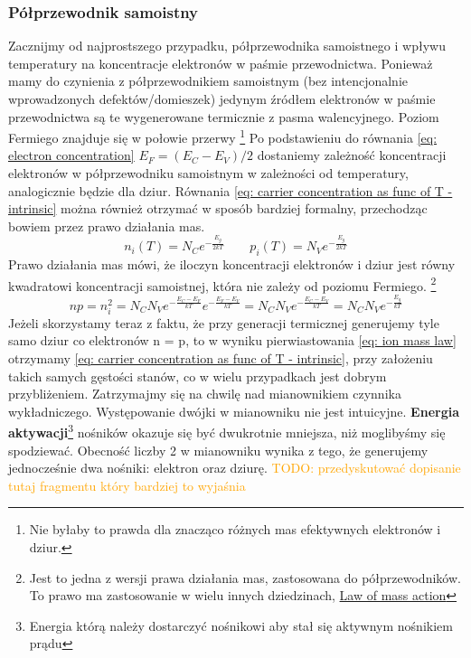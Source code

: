         \subsubsection{Półprzewodnik samoistny}
            Zacznijmy od najprostszego przypadku, półprzewodnika samoistnego i wpływu temperatury na koncentracje elektronów w paśmie przewodnictwa. 
            Ponieważ mamy do czynienia z półprzewodnikiem samoistnym (bez intencjonalnie wprowadzonych defektów/domieszek) jedynym źródłem elektronów w paśmie przewodnictwa są  te
            wygenerowane termicznie z pasma walencyjnego. Poziom Fermiego znajduje się w połowie przerwy \footnote{Nie byłaby to prawda dla znacząco różnych mas efektywnych elektronów i dziur.} 
            Po podstawieniu do równania \ref{eq: electron concentration} $E_F = (E_C - E_V)/2$ dostaniemy zależność koncentracji elektronów w półprzewodniku samoistnym w zależności od temperatury, analogicznie będzie dla dziur. 
            Równania \ref{eq: carrier concentration as func of T - intrinsic} można również otrzymać w sposób bardziej formalny, przechodząc bowiem przez prawo działania mas. \\
            \begin{equation}
                n_i(T) = N_Ce^{-\frac{E_g}{2kT}} \qquad  p_i(T) = N_Ve^{-\frac{E_g}{2kT}} \label{eq: carrier concentration as func of T - intrinsic}
            \end{equation}
            Prawo działania mas mówi, że iloczyn koncentracji elektronów i dziur jest równy kwadratowi koncentracji samoistnej, która nie zależy od poziomu Fermiego. 
            \footnote{Jest to jedna z wersji prawa działania mas, zastosowana do półprzewodników. To prawo ma zastosowanie w wielu innych dziedzinach, \href{https://en.wikipedia.org/wiki/Law_of_mass_action}{Law of mass action}}
            \begin{equation}
                np = n_i^2 = N_CN_Ve^{-\frac{E_C - E_F}{kT}}e^{-\frac{E_F - E_V}{kT}} = N_CN_Ve^{-\frac{E_C - E_V}{kT}} = N_CN_Ve^{-\frac{E_g}{kT}} \label{eq: ion mass law}
            \end{equation}
            Jeżeli skorzystamy teraz z faktu, że przy generacji termicznej generujemy tyle samo dziur co elektronów  n = p, to w wyniku pierwiastowania \ref{eq: ion mass law} otrzymamy \ref{eq: carrier concentration as func of T - intrinsic}, 
            przy założeniu takich samych gęstości stanów, co w wielu przypadkach jest dobrym przybliżeniem. Zatrzymajmy się na chwilę nad mianownikiem czynnika wykładniczego. Występowanie dwójki w mianowniku nie jest intuicyjne.
            \textbf{Energia aktywacji}\footnote{Energia którą należy dostarczyć nośnikowi aby stał się aktywnym nośnikiem prądu} nośników okazuje się być dwukrotnie mniejsza, niż moglibyśmy się spodziewać. Obecność liczby 2 w mianowniku wynika z tego, że generujemy jednocześnie dwa nośniki: elektron oraz dziurę.
            \newline\newline
            \noindent \textcolor{orange}{TODO: przedyskutować dopisanie tutaj fragmentu który bardziej to wyjaśnia}

